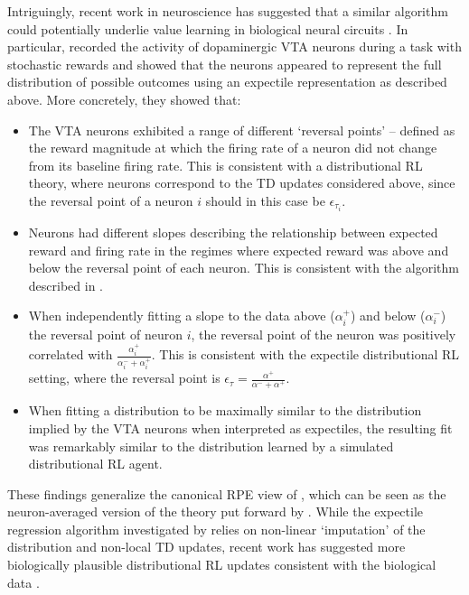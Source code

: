 Intriguingly, recent work in neuroscience has suggested that a similar algorithm could potentially underlie value learning in biological neural circuits \citep{dabney2020distributional,lowet2020distributional}.
In particular, \citet{dabney2020distributional} recorded the activity of dopaminergic VTA neurons during a task with stochastic rewards and showed that the neurons appeared to represent the full distribution of possible outcomes using an expectile representation as described above.
More concretely, they showed that:
\begin{itemize}
    \item The VTA neurons exhibited a range of different `reversal points' -- defined as the reward magnitude at which the firing rate of a neuron did not change from its baseline firing rate.
    This is consistent with a distributional RL theory, where neurons correspond to the TD updates considered above, since the reversal point of a neuron $i$ should in this case be $\epsilon_{\tau_i}$.
    \item Neurons had different slopes describing the relationship between expected reward and firing rate in the regimes where expected reward was above and below the reversal point of each neuron.
    This is consistent with the algorithm described in .
    \item When independently fitting a slope to the data above ($\alpha_i^+$) and below ($\alpha_i^-$) the reversal point of neuron $i$, the reversal point of the neuron was positively correlated with $\frac{\alpha_i^{+}}{\alpha_i^- + \alpha_i^+}$.
    This is consistent with the expectile distributional RL setting, where the reversal point is $\epsilon_\tau = \frac{\alpha^{+}}{\alpha^- + \alpha^+}$.
    \item When fitting a distribution to be maximally similar to the distribution implied by the VTA neurons when interpreted as expectiles, the resulting fit was remarkably similar to the distribution learned by a simulated distributional RL agent.
\end{itemize}
These findings generalize the canonical RPE view of \citet{schultz1997neural}, which can be seen as the neuron-averaged version of the theory put forward by \citet{dabney2020distributional}.
While the expectile regression algorithm investigated by \citet{dabney2020distributional} relies on non-linear `imputation' of the distribution and non-local TD updates, recent work has suggested more biologically plausible distributional RL updates consistent with the biological data \citep{tano2020local}.

